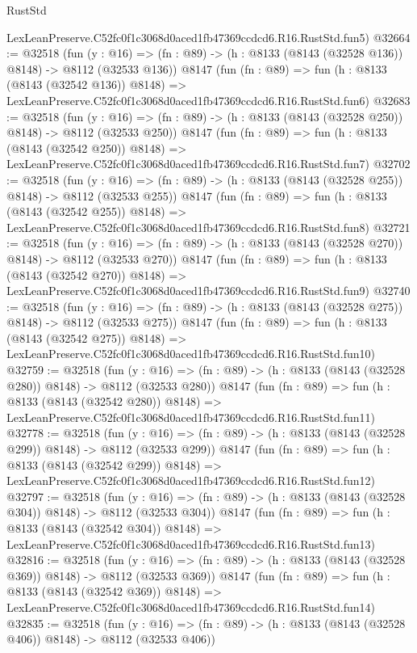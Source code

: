 \begin{lexlean}{RustStd}
\begin{coremodule}
    LexLeanPreserve.C52fc0f1c3068d0aced1fb47369ccdcd6.R16.RustStd.fun5)
@32664 := @32518
    (fun (y : @16) => (fn : @89) -> (h : @8133 (@8143 (@32528 @136)) @8148) -> @8112 (@32533 @136))
    @8147
    (fun (fn : @89) =>
    fun (h : @8133 (@8143 (@32542 @136)) @8148) =>
    LexLeanPreserve.C52fc0f1c3068d0aced1fb47369ccdcd6.R16.RustStd.fun6)
@32683 := @32518
    (fun (y : @16) => (fn : @89) -> (h : @8133 (@8143 (@32528 @250)) @8148) -> @8112 (@32533 @250))
    @8147
    (fun (fn : @89) =>
    fun (h : @8133 (@8143 (@32542 @250)) @8148) =>
    LexLeanPreserve.C52fc0f1c3068d0aced1fb47369ccdcd6.R16.RustStd.fun7)
@32702 := @32518
    (fun (y : @16) => (fn : @89) -> (h : @8133 (@8143 (@32528 @255)) @8148) -> @8112 (@32533 @255))
    @8147
    (fun (fn : @89) =>
    fun (h : @8133 (@8143 (@32542 @255)) @8148) =>
    LexLeanPreserve.C52fc0f1c3068d0aced1fb47369ccdcd6.R16.RustStd.fun8)
@32721 := @32518
    (fun (y : @16) => (fn : @89) -> (h : @8133 (@8143 (@32528 @270)) @8148) -> @8112 (@32533 @270))
    @8147
    (fun (fn : @89) =>
    fun (h : @8133 (@8143 (@32542 @270)) @8148) =>
    LexLeanPreserve.C52fc0f1c3068d0aced1fb47369ccdcd6.R16.RustStd.fun9)
@32740 := @32518
    (fun (y : @16) => (fn : @89) -> (h : @8133 (@8143 (@32528 @275)) @8148) -> @8112 (@32533 @275))
    @8147
    (fun (fn : @89) =>
    fun (h : @8133 (@8143 (@32542 @275)) @8148) =>
    LexLeanPreserve.C52fc0f1c3068d0aced1fb47369ccdcd6.R16.RustStd.fun10)
@32759 := @32518
    (fun (y : @16) => (fn : @89) -> (h : @8133 (@8143 (@32528 @280)) @8148) -> @8112 (@32533 @280))
    @8147
    (fun (fn : @89) =>
    fun (h : @8133 (@8143 (@32542 @280)) @8148) =>
    LexLeanPreserve.C52fc0f1c3068d0aced1fb47369ccdcd6.R16.RustStd.fun11)
@32778 := @32518
    (fun (y : @16) => (fn : @89) -> (h : @8133 (@8143 (@32528 @299)) @8148) -> @8112 (@32533 @299))
    @8147
    (fun (fn : @89) =>
    fun (h : @8133 (@8143 (@32542 @299)) @8148) =>
    LexLeanPreserve.C52fc0f1c3068d0aced1fb47369ccdcd6.R16.RustStd.fun12)
@32797 := @32518
    (fun (y : @16) => (fn : @89) -> (h : @8133 (@8143 (@32528 @304)) @8148) -> @8112 (@32533 @304))
    @8147
    (fun (fn : @89) =>
    fun (h : @8133 (@8143 (@32542 @304)) @8148) =>
    LexLeanPreserve.C52fc0f1c3068d0aced1fb47369ccdcd6.R16.RustStd.fun13)
@32816 := @32518
    (fun (y : @16) => (fn : @89) -> (h : @8133 (@8143 (@32528 @369)) @8148) -> @8112 (@32533 @369))
    @8147
    (fun (fn : @89) =>
    fun (h : @8133 (@8143 (@32542 @369)) @8148) =>
    LexLeanPreserve.C52fc0f1c3068d0aced1fb47369ccdcd6.R16.RustStd.fun14)
@32835 := @32518
    (fun (y : @16) => (fn : @89) -> (h : @8133 (@8143 (@32528 @406)) @8148) -> @8112 (@32533 @406))

\end{coremodule}
\end{lexlean}
